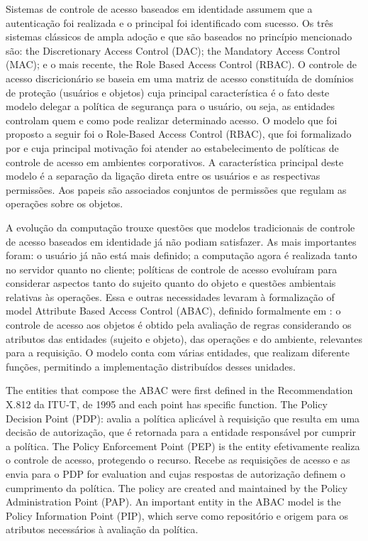 \documentclass{doublecol-new}
\begin{document}
Sistemas de controle de acesso baseados em identidade assumem que a autenticação foi realizada e o principal foi identificado com sucesso. Os três sistemas clássicos de ampla adoção e que são baseados no princípio mencionado são: the Discretionary Access Control (DAC); the Mandatory Access Control (MAC); e o mais recente, the Role Based Access Control (RBAC). O controle de acesso discricionário \cite{lampson1974protection} se baseia em uma matriz de acesso constituída de domínios de proteção (usuários e objetos) cuja principal característica é o fato deste modelo delegar a política de segurança para o usuário, ou seja, as entidades controlam quem e como pode realizar determinado acesso. O modelo que foi proposto a seguir foi o Role-Based Access Control (RBAC), que foi formalizado por \cite{ferraiolo1992role} e cuja principal motivação foi atender ao estabelecimento de políticas de controle de acesso em ambientes corporativos. A característica principal deste modelo é a separação da ligação direta entre os usuários e as respectivas permissões. Aos papeis são associados conjuntos de permissões que regulam as operações sobre os objetos.

A evolução da computação trouxe questões que modelos tradicionais de controle de acesso baseados em identidade já não podiam satisfazer. As mais importantes foram: o usuário já não está mais definido; a computação agora é realizada tanto no servidor quanto no cliente; políticas de controle de acesso evoluíram para considerar aspectos tanto do sujeito quanto do objeto e questões ambientais relativas às operações. Essa e outras necessidades levaram à formalização of model Attribute Based Access Control (ABAC), definido formalmente em \cite{huABAC2014guide}: o controle de acesso aos objetos é obtido pela avaliação de regras considerando os atributos das entidades (sujeito e objeto), das operações e do ambiente, relevantes para a requisição. O modelo conta com várias entidades, que realizam diferente funções, permitindo a implementação distribuídos desses unidades.

The entities that compose the ABAC were first defined in the Recommendation X.812 da ITU-T, de 1995 \citep{itut1996acframework} and each point has specific function. The Policy Decision Point (PDP): avalia a política aplicável à requisição que resulta em uma decisão de autorização, que é retornada para a entidade responsável por cumprir a política. The Policy Enforcement Point (PEP) is the entity efetivamente realiza o controle de acesso, protegendo o recurso. Recebe as requisições de acesso e as envia para o PDP for evaluation and cujas respostas de autorização definem o cumprimento da política. The policy are created and maintained by the Policy Administration Point (PAP). An important entity in the ABAC model is the Policy Information Point (PIP), which serve como repositório e origem para os atributos necessários à avaliação da política.
\end{document}
